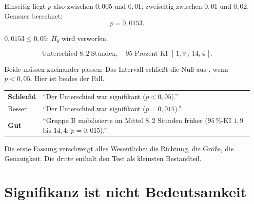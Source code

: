 \begin{merksatz}
Einseitig liegt $p$ also zwischen $0{,}005$ und $0{,}01$; zweiseitig zwischen $0{,}01$ und $0{,}02$. Genauer berechnet:
\[ p = 0{,}0153 . \]

$0{,}0153 \le 0{,}05$: $H_0$ wird verworfen.

\[ \text{Unterschied } 8{,}2 \ \text{Stunden}, \quad 95\text{-Prozent-KI } [\,1{,}9\ ;\ 14{,}4\,] . \]

Beide müssen zueinander passen: Das Intervall schließt die Null aus , wenn $p < 0{,}05$. Hier ist beides der Fall. \checkmark

\begin{center}
\begin{minipage}{0.88\textwidth}
\end{minipage}
\end{center}
\end{merksatz}

\begin{merksatz}
\begin{center}
{\small
\renewcommand{\arraystretch}{1.5}
\begin{tabular}{@{}P{2.0cm}P{6.4cm}@{}}
\toprule
\textcolor{akzent}{\textbf{Schlecht}} & \enquote{Der Unterschied war signifikant ($p < 0{,}05$).}\\
\textcolor{mittel}{Besser} & \enquote{Der Unterschied war signifikant ($p = 0{,}015$).}\\
\textcolor{gruen}{\textbf{Gut}} & \enquote{Gruppe B mobilisierte im Mittel $8{,}2$ Stunden früher ($95\,\%$-KI $1{,}9$ bis $14{,}4$; $p = 0{,}015$).}\\
\bottomrule
\end{tabular}}
\end{center}

Die erste Fassung verschweigt alles Wesentliche: die Richtung, die Größe, die Genauigkeit. Die dritte enthält den Test als kleinsten Bestandteil.
\end{merksatz}

\section{Signifikanz ist nicht Bedeutsamkeit}

